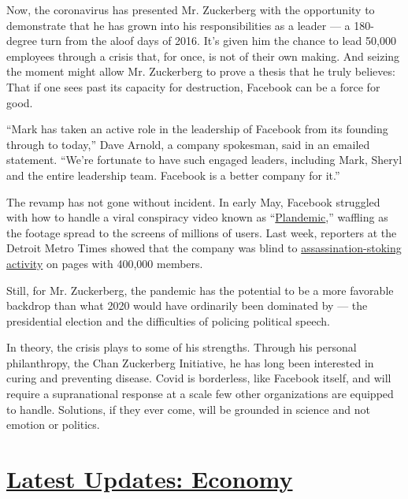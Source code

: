 Now, the coronavirus has presented Mr. Zuckerberg with the opportunity
to demonstrate that he has grown into his responsibilities as a leader
--- a 180-degree turn from the aloof days of 2016. It's given him the
chance to lead 50,000 employees through a crisis that, for once, is not
of their own making. And seizing the moment might allow Mr. Zuckerberg
to prove a thesis that he truly believes: That if one sees past its
capacity for destruction, Facebook can be a force for good.

``Mark has taken an active role in the leadership of Facebook from its
founding through to today,'' Dave Arnold, a company spokesman, said in
an emailed statement. ``We're fortunate to have such engaged leaders,
including Mark, Sheryl and the entire leadership team. Facebook is a
better company for it.''

The revamp has not gone without incident. In early May, Facebook
struggled with how to handle a viral conspiracy video known as
``\href{https://www.nytimes.com/2020/05/09/technology/plandemic-judy-mikovitz-coronavirus-disinformation.html}{Plandemic},''
waffling as the footage spread to the screens of millions of users. Last
week, reporters at the Detroit Metro Times showed that the company was
blind to
\href{https://www.metrotimes.com/news-hits/archives/2020/05/11/whitmer-becomes-target-of-dozens-of-threats-on-private-facebook-groups-ahead-of-armed-rally-in-lansing}{assassination-stoking
activity} on pages with 400,000 members.

Still, for Mr. Zuckerberg, the pandemic has the potential to be a more
favorable backdrop than what 2020 would have ordinarily been dominated
by --- the presidential election and the difficulties of policing
political speech.

In theory, the crisis plays to some of his strengths. Through his
personal philanthropy, the Chan Zuckerberg Initiative, he has long been
interested in curing and preventing disease. Covid is borderless, like
Facebook itself, and will require a supranational response at a scale
few other organizations are equipped to handle. Solutions, if they ever
come, will be grounded in science and not emotion or politics.

\hypertarget{latest-updates-economy}{%
\section{\texorpdfstring{\href{https://www.nytimes.com/live/2020/07/31/business/stock-market-today-coronavirus?action=click\&pgtype=Article\&state=default\&region=MAIN_CONTENT_1\&context=storylines_live_updates}{Latest
Updates:
Economy}}{Latest Updates: Economy}}\label{latest-updates-economy}}

